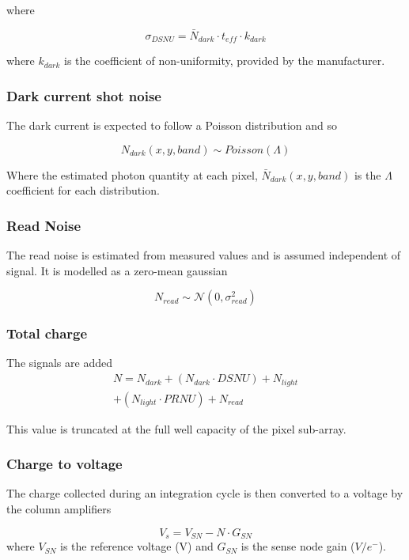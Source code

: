\documentclass[10pt,a4paper,final,twocolumn]{article}
\begin{document}
where

\begin{equation}
\sigma_{DSNU} = \bar{N}_{dark} \cdot t_{eff} \cdot k_{dark}
\end{equation}

where $k_{dark}$ is the coefficient of non-uniformity, provided by the manufacturer.

\subsubsection{Dark current shot noise}
The dark current is expected to follow a Poisson distribution and so 

\begin{equation}
N_{dark}(x, y, band) \sim Poisson(\Lambda)
\end{equation}

Where the estimated photon quantity at each pixel, $\bar{N}_{dark}(x, y, band) $ is the $\Lambda$ coefficient for each distribution.

\subsubsection{Read Noise}
The read noise is estimated from measured values and is assumed independent of signal. It is modelled as a zero-mean gaussian

\begin{equation}
N_{read} \sim \mathcal{N}(0, \sigma_{read}^{2})
\end{equation}

\subsubsection{Total charge}
The signals are added
\begin{multline}
N = N_{dark} + (N_{dark} \cdot DSNU) + N_{light}\\
+ (N_{light} \cdot PRNU) + N_{read}
\end{multline}

This value is truncated at the full well capacity of the pixel sub-array.


\subsubsection{Charge to voltage}
The charge collected during an integration cycle is then converted to a voltage by the column amplifiers

\begin{equation}
V_s = V_{SN} - N \cdot G_{SN}
\end{equation}
where $V_{SN}$  is the reference voltage (V) and $G_{SN}$ is the sense node gain ($V/e^{-}$).
\end{document}
